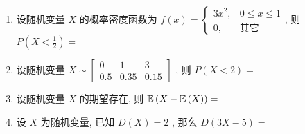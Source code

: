 \begin{enumerate}
	\item 设随机变量 $X$ 的概率密度函数为 $f(x)=
	\begin{cases}
	3x^2, & 0\leq x\leq 1\\
	0, & \text{其它}
	\end{cases}
	$, 则$ P\left(X<\frac{1}{2}\right)=$
	
	\underline{\hspace{8pc}}

	\item 设随机变量 $X\sim
	\begin{bmatrix}
	0 & 1 & 3\\
	0.5 & 0.35 & 0.15
	\end{bmatrix}
	$ , 则 $P(X<2)=$\underline{\hspace{8pc}}
	
	\item 设随机变量 $X$ 的期望存在, 则 $\mathbb{E}\,(X-\mathbb{E}\,(X))=$\underline{\hspace{8pc}}
	
	\item 设 $X$ 为随机变量, 已知 $D(X)=2$ , 那么 $D(3X-5)=$\underline{\hspace{8pc}}
 \end{enumerate}

